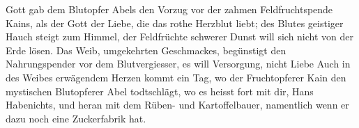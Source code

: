 Gott gab dem Blutopfer Abels den Vorzug vor der zahmen Feldfruchtspende Kains, als der Gott der Liebe, die das rothe Herzblut liebt; des Blutes geistiger Hauch steigt zum Himmel, der Feldfrüchte schwerer Dunst will sich nicht von der Erde lösen. Das Weib, umgekehrten Geschmackes, begünstigt den Nahrungspender vor dem Blutvergiesser, es will Versorgung, nicht Liebe  Auch in des Weibes erwägendem Herzen kommt ein Tag, wo der Fruchtopferer Kain den mystischen Blutopferer Abel todtschlägt, wo es heisst  fort mit dir, Hans Habenichts, und heran mit dem Rüben- und Kartoffelbauer, namentlich wenn er dazu noch eine Zuckerfabrik hat.
\par

